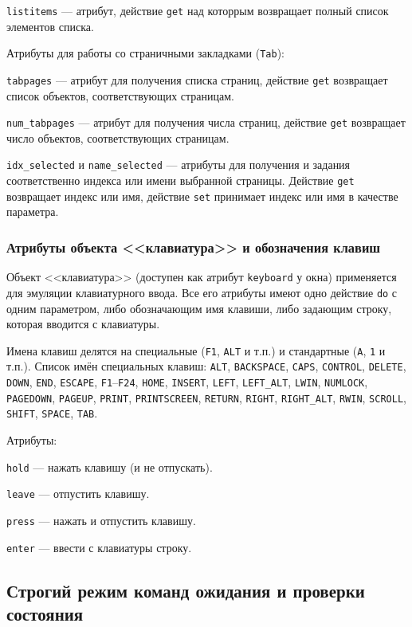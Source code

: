 \documentclass[11pt]{book} %
\begin{document}
\verb|listitems| --- атрибут, действие \verb|get| над которрым возвращает полный список элементов списка.

Атрибуты для работы со страничными закладками (\verb|Tab|):

\verb|tabpages| --- атрибут для получения списка страниц, действие \verb|get| возвращает список объектов, соответствующих страницам.

\verb|num_tabpages| --- атрибут для получения числа страниц, действие \verb|get| возвращает число объектов, соответствующих страницам.

\verb|idx_selected| и \verb|name_selected| --- атрибуты для получения и задания соответственно индекса или имени выбранной страницы. Действие \verb|get| возвращает индекс или имя, действие \verb|set| принимает индекс или имя в качестве параметра.


\subsubsection{Атрибуты объекта <<клавиатура>> и обозначения клавиш}

Объект <<клавиатура>> (доступен как атрибут \verb|keyboard| у окна) применяется для эмуляции клавиатурного ввода. Все его атрибуты имеют одно действие \verb|do| с одним параметром, либо обозначающим имя клавиши, либо задающим строку, которая вводится с клавиатуры.

Имена клавиш делятся на специальные (\verb|F1|, \verb|ALT| и т.п.) и стандартные (\verb|A|, \verb|1| и т.п.). Список имён специальных клавиш: \verb'ALT', \verb'BACKSPACE', \verb'CAPS', \verb'CONTROL', \verb'DELETE', \verb'DOWN', \verb'END', \verb'ESCAPE', \verb'F1'--\verb'F24', \verb'HOME', \verb'INSERT', \verb'LEFT', \verb'LEFT_ALT', \verb'LWIN', \verb'NUMLOCK', \verb'PAGEDOWN', \verb'PAGEUP', \verb'PRINT', \verb'PRINTSCREEN', \verb'RETURN', \verb'RIGHT', \verb'RIGHT_ALT', \verb'RWIN', \verb'SCROLL', \verb'SHIFT', \verb'SPACE', \verb'TAB'.


Атрибуты:

\verb|hold| --- нажать клавишу (и не отпускать).

\verb|leave| --- отпустить клавишу.

\verb|press| --- нажать и отпустить клавишу.

\verb|enter| --- ввести с клавиатуры строку.

\subsection{Строгий режим команд ожидания и проверки состояния}
\end{document}
